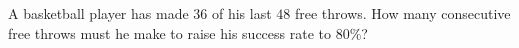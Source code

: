 A basketball player has made $36$ of his last $48$ free throws. How many consecutive free throws must he make to raise his success rate to $80\%$?
